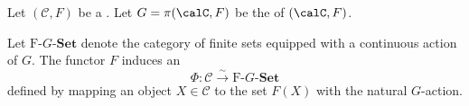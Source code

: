 \begin{theorem} \label{theorem:fiber_functor_on_a_galois_category_induces_equivalence_of_categories_to_category_of_finite_groups_with_continuous_action_by_fundamental_group}
Let $(\mathcal{C}, F)$ be a . Let $G = \pi(\calC, F)$ be the  of $(\calC, F)$. 

Let $\text{F-}G\textbf{-Set}$ denote the category of finite sets equipped with a continuous action of $G$. The functor $F$ induces an 
$$ \Phi: \mathcal{C} \xrightarrow{\sim} \text{F-}G\textbf{-Set} $$
defined by mapping an object $X \in \mathcal{C}$ to the set $F(X)$ with the natural $G$-action.
\end{theorem}